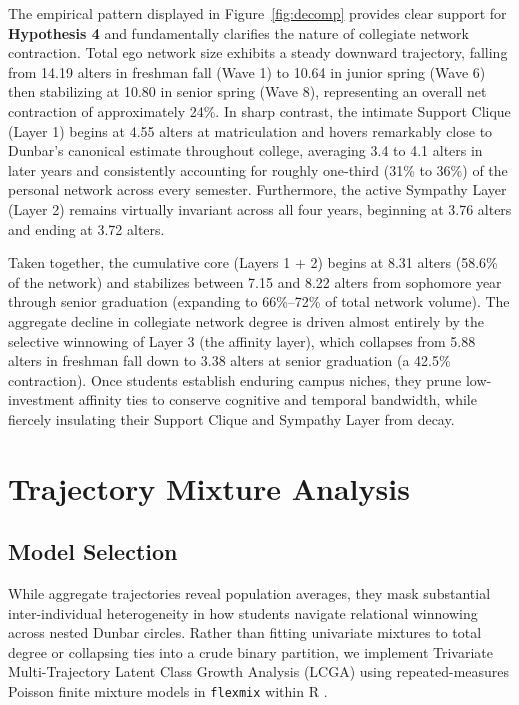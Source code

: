 \documentclass[12pt]{article}
\begin{document}
The empirical pattern displayed in Figure~\ref{fig:decomp} provides clear support for \textbf{Hypothesis 4} and fundamentally clarifies the nature of collegiate network contraction. Total ego network size exhibits a steady downward trajectory, falling from 14.19 alters in freshman fall (Wave 1) to 10.64 in junior spring (Wave 6) then stabilizing at 10.80 in senior spring (Wave 8), representing an overall net contraction of approximately 24\%. In sharp contrast, the intimate Support Clique (Layer 1) begins at 4.55 alters at matriculation and hovers remarkably close to Dunbar's canonical estimate throughout college, averaging 3.4 to 4.1 alters in later years and consistently accounting for roughly one-third (31\% to 36\%) of the personal network across every semester. Furthermore, the active Sympathy Layer (Layer 2) remains virtually invariant across all four years, beginning at 3.76 alters and ending at 3.72 alters.

Taken together, the cumulative core (Layers 1 + 2) begins at 8.31 alters (58.6\% of the network) and stabilizes between 7.15 and 8.22 alters from sophomore year through senior graduation (expanding to 66\%--72\% of total network volume). The aggregate decline in collegiate network degree is driven almost entirely by the selective winnowing of Layer 3 (the affinity layer), which collapses from 5.88 alters in freshman fall down to 3.38 alters at senior graduation (a 42.5\% contraction). Once students establish enduring campus niches, they prune low-investment affinity ties to conserve cognitive and temporal bandwidth, while fiercely insulating their Support Clique and Sympathy Layer from decay.

\section{Trajectory Mixture Analysis}

\subsection{Model Selection}

While aggregate trajectories reveal population averages, they mask substantial inter-individual heterogeneity in how students navigate relational winnowing across nested Dunbar circles. Rather than fitting univariate mixtures to total degree or collapsing ties into a crude binary partition, we implement Trivariate Multi-Trajectory Latent Class Growth Analysis (LCGA) using repeated-measures Poisson finite mixture models in \texttt{flexmix} \citep{grun2008flexmix} within \textsf{R} \citep{rcoreteam2024}.
\end{document}
